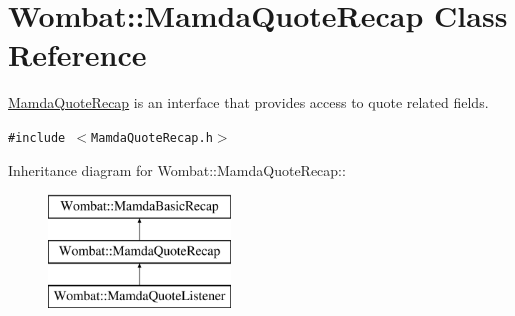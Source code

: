 \hypertarget{classWombat_1_1MamdaQuoteRecap}{
\section{Wombat::Mamda\-Quote\-Recap Class Reference}
\label{classWombat_1_1MamdaQuoteRecap}
}
\hyperlink{classWombat_1_1MamdaQuoteRecap}{Mamda\-Quote\-Recap} is an interface that provides access to quote related fields.  


{\tt \#include $<$Mamda\-Quote\-Recap.h$>$}

Inheritance diagram for Wombat::Mamda\-Quote\-Recap::\begin{figure}[H]
\begin{center}
\leavevmode
\includegraphics[height=3cm]{classWombat_1_1MamdaQuoteRecap}
\end{center}
\end{figure}
